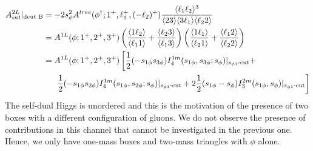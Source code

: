 \documentclass{article}
\numberwithin{equation}{section}
\begin{document}
\begin{align*}
	A^{2L}_{int}|_{\text{dcut B}}&=-2 s_\phi^2 A^{tree}(\phi^\dagger;1^+,\ell_1^+,(-\ell_2)^+)\frac{\langle \ell_1 \ell_2 \rangle^3}{\langle 23 \rangle \langle 3 \ell_1 \rangle \langle \ell_2 2 \rangle}\\
	&=A^{1L}(\phi;1^+,2^+,3^+)\left(\frac{\langle 1 \ell_2 \rangle}{\langle \ell_1 1 \rangle}+\frac{\langle \ell_2 3 \rangle}{\langle \ell_1 3 \rangle}\right)\left(\frac{\langle 1 \ell_1 \rangle}{\langle \ell_2 1 \rangle}+\frac{\langle \ell_1 2 \rangle}{\langle \ell_2 2 \rangle}\right)\\
	&=A^{1L}(\phi;1^+,2^+,3^+)\left[\frac{1}{2}(-s_{1\phi}s_{3\phi})I_4^{1m}(s_{1\phi},s_{3\phi};s_\phi)|_{s_{\phi1}\text{-cut}}+\right.\\
	&\hspace{0.5cm}\left.\frac{1}{2}(-s_{1\phi}s_{2\phi})I_4^{1m}(s_{1\phi},s_{2\phi};s_\phi)|_{s_{\phi1}\text{-cut}} +2\frac{1}{2}(s_{1\phi}-s_\phi) I_3^{2m}(s_{1\phi},s_\phi)|_{s_{\phi1}\text{-cut}}\right]
\end{align*}
The self-dual Higgs is unordered and this is the motivation of the presence of two boxes with a different configuration of gluons.
We do not observe the presence of contributions in this channel that cannot be investigated in the previous one. Hence, we only have one-mass boxes and two-mass triangles with $\phi$ alone.
\end{document}
